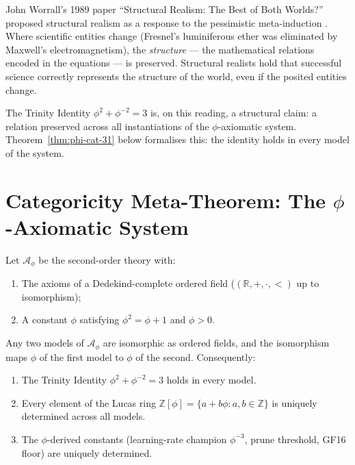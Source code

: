 John Worrall's 1989 paper ``Structural Realism: The Best of Both Worlds?''
proposed structural realism as a response to the pessimistic meta-induction
\cite{worrall1989structural}.  Where scientific entities change (Fresnel's
luminiferous ether was eliminated by Maxwell's electromagnetism), the
\emph{structure} — the mathematical relations encoded in the equations — is
preserved.  Structural realists hold that successful science correctly
represents the structure of the world, even if the posited entities change.

The Trinity Identity \(\phi^2 + \phi^{-2} = 3\) is, on this reading, a
structural claim: a relation preserved across all instantiations of the
\(\phi\)-axiomatic system.  Theorem~\ref{thm:phi-cat-31} below formalises
this: the identity holds in every model of the system.

\section{Categoricity Meta-Theorem: The \(\phi\)-Axiomatic System}
\label{sec:phd31-categoricity}

\begin{definition}
\label{def:phi-axiomatic-31}
Let \(\mathcal{A}_\phi\) be the second-order theory with:
\begin{enumerate}[label=(\roman*)]
  \item The axioms of a Dedekind-complete ordered field
        (\((\mathbb{R}, +, \cdot, <)\) up to isomorphism);
  \item A constant \(\phi\) satisfying \(\phi^2 = \phi + 1\) and \(\phi > 0\).
\end{enumerate}
\end{definition}

\begin{theorem}
\label{thm:phi-cat-31}
Any two models of \(\mathcal{A}_\phi\) are isomorphic as ordered fields, and
the isomorphism maps \(\phi\) of the first model to \(\phi\) of the second.
Consequently:
\begin{enumerate}[label=(\alph*)]
  \item The Trinity Identity \(\phi^2 + \phi^{-2} = 3\) holds in every model.
  \item Every element of the Lucas ring
        \(\mathbb{Z}[\phi] = \{a + b\phi : a, b \in \mathbb{Z}\}\) is
        uniquely determined across all models.
  \item The \(\phi\)-derived constants (learning-rate champion \(\phi^{-3}\),
        prune threshold, GF16 floor) are uniquely determined.
\end{enumerate}
\end{theorem}

